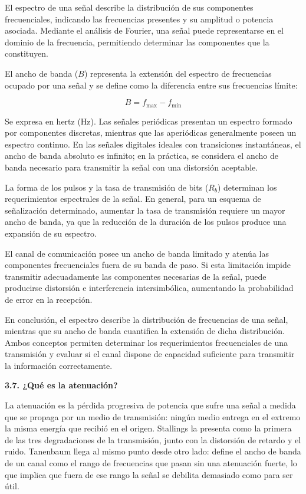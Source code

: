 \documentclass[11pt,a4paper]{article}
\begin{document}
El espectro de una señal describe la distribución de sus componentes frecuenciales, indicando las frecuencias presentes y su amplitud o potencia asociada. Mediante el análisis de Fourier, una señal puede representarse en el dominio de la frecuencia, permitiendo determinar las componentes que la constituyen.

El ancho de banda ($B$) representa la extensión del espectro de frecuencias ocupado por una señal y se define como la diferencia entre sus frecuencias límite:

\begin{equation}
    B = f_{\max} - f_{\min}
\end{equation}

Se expresa en hertz (Hz). Las señales periódicas presentan un espectro formado por componentes discretas, mientras que las aperiódicas generalmente poseen un espectro continuo. En las señales digitales ideales con transiciones instantáneas, el ancho de banda absoluto es infinito; en la práctica, se considera el ancho de banda necesario para transmitir la señal con una distorsión aceptable.

La forma de los pulsos y la tasa de transmisión de bits ($R_b$) determinan los requerimientos espectrales de la señal. En general, para un esquema de señalización determinado, aumentar la tasa de transmisión requiere un mayor ancho de banda, ya que la reducción de la duración de los pulsos produce una expansión de su espectro.

El canal de comunicación posee un ancho de banda limitado y atenúa las componentes frecuenciales fuera de su banda de paso. Si esta limitación impide transmitir adecuadamente las componentes necesarias de la señal, puede producirse distorsión e interferencia intersimbólica, aumentando la probabilidad de error en la recepción.

En conclusión, el espectro describe la distribución de frecuencias de una señal, mientras que su ancho de banda cuantifica la extensión de dicha distribución. Ambos conceptos permiten determinar los requerimientos frecuenciales de una transmisión y evaluar si el canal dispone de capacidad suficiente para transmitir la información correctamente.

\vspace{0.3cm}
\noindent\textbf{3.7. ¿Qué es la atenuación?}\par
La atenuación es la pérdida progresiva de potencia que sufre una señal a medida que se propaga por un medio de transmisión: ningún medio entrega en el extremo la misma energía que recibió en el origen. Stallings la presenta como la primera de las tres degradaciones de la transmisión, junto con la distorsión de retardo y el ruido. Tanenbaum llega al mismo punto desde otro lado: define el ancho de banda de un canal como el rango de frecuencias que pasan sin una atenuación fuerte, lo que implica que fuera de ese rango la señal se debilita demasiado como para ser útil.
\end{document}
